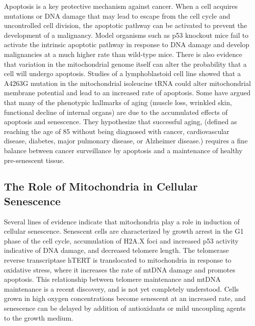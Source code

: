Apoptosis is a key protective mechanism against cancer.  When a cell acquires mutations or DNA damage that may lead to escape from the cell cycle and uncontrolled cell division, the apoptotic pathway can be activated to prevent the development of a malignancy.  Model organisms such as p53 knockout mice fail to activate the intrinsic apoptotic pathway in response to DNA damage and develop malignancies at a much higher rate than wild-type mice\cite{symonds1994p53}.  There is also evidence that variation in the mitochondrial genome itself can alter the probability that a cell will undergo apoptosis.  Studies of a lymphoblastoid cell line showed that a A4263G mutation in the mitochondrial isoleucine tRNA could alter mitochondrial membrane potential and lead to an increased rate of apoptosis\cite{yuqi2009voltage}.  Some have argued that many of the phenotypic hallmarks of aging (muscle loss, wrinkled skin, functional decline of internal organs) are due to the accumulated effects of apoptosis and senescence\cite{campisi2005senescent}.  They hypothesize that successful aging, (defined as reaching the age of 85 without being diagnosed with cancer, cardiovascular disease, diabetes, major pulmonary disease, or Alzheimer disease.)\cite{halaschek2009genetic} requires a fine balance between cancer surveillance by apoptosis and a maintenance of healthy pre-senescent tissue\cite{rodier2007two}.

\subsection{The Role of Mitochondria in Cellular Senescence}
Several lines of evidence indicate that mitochondria play a role in induction of cellular senescence. Senescent cells are characterized by growth arrest in the G1 phase of the cell cycle, accumulation of H2A.X foci and increased p53 activity indicative of DNA damage, and decreased telomere length\cite{passos2005mitochondria}.  The telomerase reverse transcriptase hTERT is translocated to mitochondria in response to oxidative stress, where it increases the rate of mtDNA damage and promotes apoptosis\cite{santos2004mitochondrial}.  This relationship between telomere maintenance and mtDNA maintenance is a recent discovery, and is not yet completely understood\cite{passos2007dna}.  Cells grown in high oxygen concentrations become senescent at an increased rate, and senescence can be delayed by addition of antioxidants or mild uncoupling agents to the growth medium\cite{haendeler2004antioxidants}.

